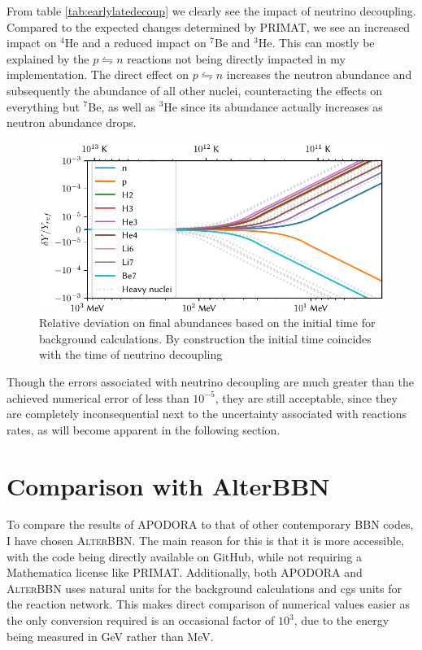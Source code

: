 From table \ref{tab:earlylatedecoup} we clearly see the impact of neutrino decoupling. Compared to the expected changes determined by PRIMAT\cite{PRIMAT}, we see an increased impact on ${}^4$He and a reduced impact on ${}^7$Be and ${}^3$He. This can mostly be explained by the $p\leftrightharpoons n$ reactions not being directly impacted in my implementation. The direct effect on $p\leftrightharpoons n$ increases the neutron abundance and subsequently the abundance of all other nuclei, counteracting the effects on everything but ${}^7$Be, as well as ${}^3$He since its abundance actually increases as neutron abundance drops.%
\begin{figure}[ht]
    \includegraphics[width=5.1in]{figures/initime.pdf}
    \caption{Relative deviation on final abundances based on the initial time for background calculations. By construction the initial time coincides with the time of neutrino decoupling}
    \label{fig:initime}
\end{figure}

Though the errors associated with neutrino decoupling are much greater than the achieved numerical error of less than $10^{-5}$, they are still acceptable, since they are completely inconsequential next to the uncertainty associated with reactions rates, as will become apparent in the following section.


\section{Comparison with AlterBBN}
\label{sec:Altercompare}
To compare the results of APODORA to that of other contemporary BBN codes, I have chosen \textsc{AlterBBN}. The main reason for this is that it is more accessible, with the code being directly available on GitHub, while not requiring a Mathematica license like PRIMAT. Additionally, both APODORA and \textsc{AlterBBN} uses natural units for the background calculations and cgs units for the reaction network. This makes direct comparison of numerical values easier as the only conversion required is an occasional factor of $10^3$, due to the energy being measured in GeV rather than MeV.%


